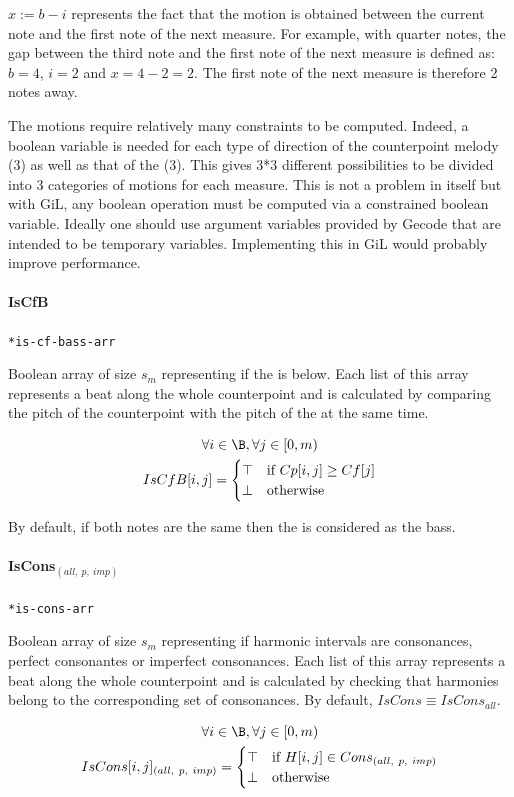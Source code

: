 $x:=b-i$ represents the fact that the motion is obtained between the current note and the first note of the next measure. For example, with quarter notes, the gap between the third note and the first note of the next measure is defined as: $b=4$, $i=2$ and $x=4-2=2$. The first note of the next measure is therefore 2 notes away.

The motions require relatively many constraints to be computed. Indeed, a boolean variable is needed for each type of direction of the counterpoint melody (3) as well as that of the \cf (3). This gives 3*3 different possibilities to be divided into 3 categories of motions for each measure. This is not a problem in itself but with GiL, any boolean operation must be computed via a constrained boolean variable. Ideally one should use argument variables provided by Gecode that are intended to be temporary variables. Implementing this in GiL would probably improve performance.

\paragraph{IsCfB} \texttt{*is-cf-bass-arr}

Boolean array of size $s_{m}$ representing if the \cf is below. Each list of this array represents a beat along the whole counterpoint and is calculated by comparing the pitch of the counterpoint with the pitch of the \cf at the same time.

\begin{equation}
    \begin{gathered}
    \forall i \in \B, \forall j \in [0, m)\\
    IsCfB[i, j] =
    \begin{cases}
        \top & \text{if } Cp[i, j] \geq Cf[j] \\
        \bot & \text{otherwise}
    \end{cases}
    \end{gathered}
\end{equation}

By default, if both notes are the same then the \cf is considered as the bass.

\paragraph{IsCons$_{(all,\ p,\ imp)}$} \texttt{*is-cons-arr}

Boolean array of size $s_{m}$ representing if harmonic intervals are consonances, perfect consonantes or imperfect consonances. Each list of this array represents a beat along the whole counterpoint and is calculated by checking that harmonies belong to the corresponding set of consonances. By default, $IsCons \equiv IsCons_{all}$.

\begin{equation}
    \begin{gathered}
    \forall i \in \B, \forall j \in [0, m)\\
    IsCons[i, j]_{(all,\ p,\ imp)} =
    \begin{cases}
        \top & \text{if } H[i, j] \in Cons_{(all,\ p,\ imp)}\\
        \bot & \text{otherwise}
    \end{cases}
    \end{gathered}
\end{equation}